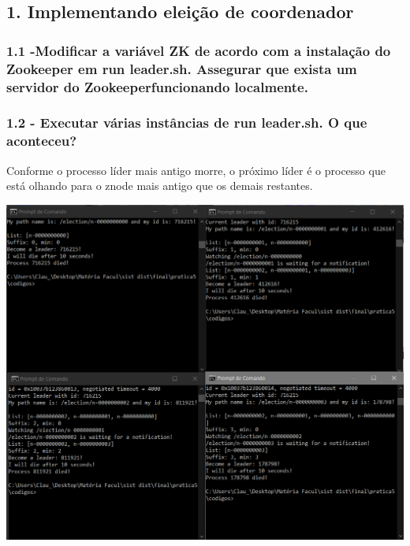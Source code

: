 \subsection*{1. Implementando eleição de coordenador}

\subsubsection{1.1 -Modificar a variável ZK de acordo com a instalação do Zookeeper em
run leader.sh. Assegurar que exista um servidor do Zookeeperfuncionando localmente.}

\vspace{-0.5em}
\begin{minipage}{\textwidth}
  \hspace{-1em}
  \centering
  
  \label{prog1}
  \hspace{1em}
\end{minipage}
\vspace{0.5em}

\subsubsection{1.2 - Executar várias instâncias de run leader.sh. O que aconteceu?}

Conforme o processo líder mais antigo morre, o próximo líder é o processo que está olhando para o znode mais antigo que os demais restantes. \newline

\includegraphics[width=20cm]{pratica5/prints/roteiro 1.2.PNG}

